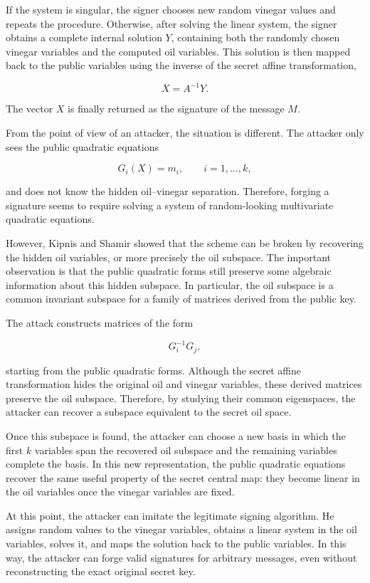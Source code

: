 \noindent
If the system is singular, the signer chooses new random vinegar values and repeats the procedure. Otherwise, after solving the linear system, the signer obtains a complete internal solution \(Y\), containing both the randomly chosen 
vinegar variables and the computed oil variables. This solution is then mapped back to the public variables using the inverse of the secret affine transformation,

\[
X = A^{-1}Y.
\]

\noindent
The vector \(X\) is finally returned as the signature of the message \(M\).
\medskip

\noindent
From the point of view of an attacker, the situation is different. The attacker only sees the public quadratic equations

\[
G_i(X) = m_i, \qquad i=1,\ldots,k,
\]

\noindent
and does not know the hidden oil--vinegar separation. Therefore, forging a signature seems to require solving a system of random-looking multivariate quadratic equations.
\medskip

\noindent
However, Kipnis and Shamir showed that the scheme can be broken by recovering the hidden oil variables, or more precisely the oil subspace. The important 
observation is that the public quadratic forms still preserve some algebraic information about this hidden subspace. In particular, the oil subspace is a common invariant subspace for a family of matrices derived from the public key.
\medskip

\noindent
The attack constructs matrices of the form

\[
G_i^{-1}G_j,
\]

\noindent
starting from the public quadratic forms. Although the secret affine transformation hides the original oil and vinegar variables, these derived matrices preserve the oil subspace. Therefore, by studying their common eigenspaces, the attacker can recover a subspace equivalent to the secret oil space.
\medskip

\noindent
Once this subspace is found, the attacker can choose a new basis in which the first \(k\) variables span the recovered oil subspace and the remaining variables complete the basis. In this new representation, the public quadratic equations recover the same useful property of the secret central map: they become linear in the oil variables once the vinegar variables are fixed.
\medskip

\noindent
At this point, the attacker can imitate the legitimate signing algorithm. He assigns random values to the vinegar variables, obtains a linear system in the oil variables, solves it, and maps the solution back to the public variables. In this way, the attacker can forge valid signatures for arbitrary messages, even without reconstructing the exact original secret key.

